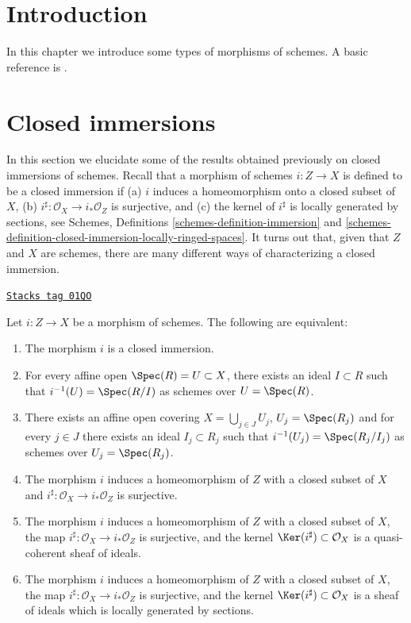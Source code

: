 \section{Introduction}
\label{morphisms-section-introduction}
In this chapter we introduce some types of morphisms of schemes.
A basic reference is \cite{EGA}.

\section{Closed immersions}
\label{morphisms-section-closed-immersions}
In this section we elucidate some of the results obtained previously on closed
immersions of schemes. Recall that a morphism of schemes $i : Z \to X$
is defined to be a closed immersion if (a) $i$ induces a homeomorphism onto
a closed subset of $X$, (b) $i^\sharp : \mathcal{O}_X \to i_*\mathcal{O}_Z$
is surjective, and (c) the kernel of $i^\sharp$ is locally generated by
sections, see Schemes, Definitions \ref{schemes-definition-immersion}
and \ref{schemes-definition-closed-immersion-locally-ringed-spaces}. It turns
out that, given that $Z$ and $X$ are schemes, there are many different
ways of characterizing a closed immersion.

\begin{lemma}
\label{morphisms-lemma-closed-immersion}
\href{https://stacks.math.columbia.edu/tag/01QO}{\texttt{Stacks tag 01QO}}

Let $i : Z \to X$ be a morphism of schemes.
The following are equivalent:
\begin{enumerate}
\item The morphism $i$ is a closed immersion.
\item For every affine open $\Spec(R) = U \subset X$,
there exists an ideal $I \subset R$ such that
$i^{-1}(U) = \Spec(R/I)$ as schemes over $U = \Spec(R)$.
\item There exists an affine open covering $X = \bigcup_{j \in J} U_j$,
$U_j = \Spec(R_j)$ and for every $j \in J$ there exists
an ideal $I_j \subset R_j$ such that
$i^{-1}(U_j) = \Spec(R_j/I_j)$ as schemes over $U_j = \Spec(R_j)$.
\item The morphism $i$ induces a homeomorphism of $Z$ with a closed subset
of $X$ and $i^\sharp : \mathcal{O}_X \to i_*\mathcal{O}_Z$ is surjective.
\item The morphism $i$ induces a homeomorphism of $Z$ with a closed subset
of $X$, the map $i^\sharp : \mathcal{O}_X \to i_*\mathcal{O}_Z$ is surjective,
and the kernel $\Ker(i^\sharp)\subset \mathcal{O}_X$ is a quasi-coherent
sheaf of ideals.
\item The morphism $i$ induces a homeomorphism of $Z$ with a closed subset
of $X$, the map $i^\sharp : \mathcal{O}_X \to i_*\mathcal{O}_Z$ is surjective,
and the kernel $\Ker(i^\sharp)\subset \mathcal{O}_X$ is a
sheaf of ideals which is locally generated by sections.
\end{enumerate}
\end{lemma}

